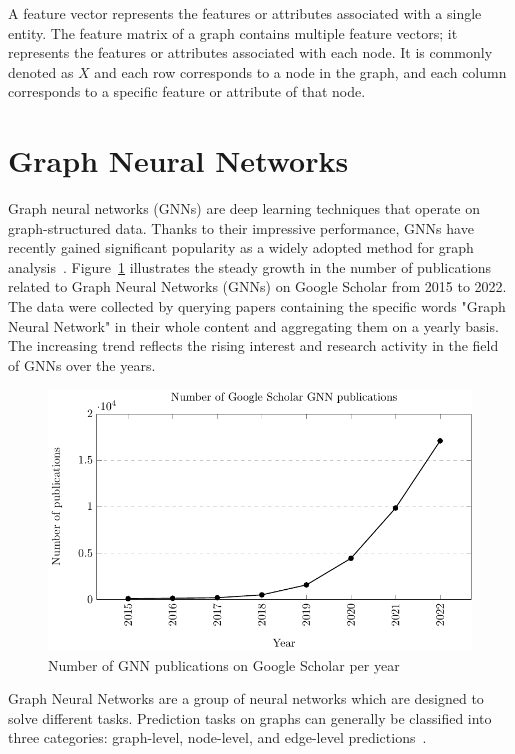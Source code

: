A feature vector represents the features or attributes associated with a single entity.
The feature matrix of a graph contains multiple feature vectors; it represents the features or attributes associated with each node.
It is commonly denoted as $X$ and  each row corresponds to a node in the graph, and each column corresponds to a specific feature or attribute of that node.

\section{Graph Neural Networks}
\label{sec:graph_neural_networks}%


Graph neural networks (GNNs) are deep learning techniques that operate on graph-structured data.
Thanks to their impressive performance, GNNs have recently gained significant popularity as a widely adopted method for graph analysis~\cite{KERAMATFAR2022100401}.
Figure~\ref{fig:google_scholar} illustrates the steady growth in the number of publications related to Graph Neural Networks (GNNs) on Google Scholar from 2015 to 2022.
The data were collected by querying papers containing the specific words "Graph Neural Network" in their whole content and aggregating them on a yearly basis.
The increasing trend reflects the rising interest and research activity in the field of GNNs over the years.

\begin{figure}[t]
    \centering
    \includegraphics[height=0.4\textwidth]{Images/google_scholar}
    \caption{Number of GNN publications on Google Scholar per year}
    \label{fig:google_scholar}
\end{figure}

Graph Neural Networks are a group of neural networks which are designed to solve different tasks.
Prediction tasks on graphs can generally be classified into three categories: graph-level, node-level, and edge-level predictions~\cite{sanchez-lengeling2021a}.

